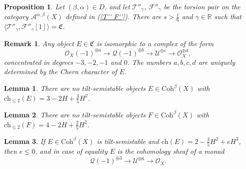 \documentclass[10pt,a4paper]{amsart}
\newtheorem{proposition}{Proposition}
\newtheorem{lemma}{Lemma}
\newtheorem{remark}{Remark}
\def\FF{\ensuremath{\mathcal F}}
\def\R{\ensuremath{\mathbb{R}}}
\def\TT{\ensuremath{\mathcal T}}
\begin{document}
	\begin{proposition}\label{heart}Let $(\beta,\alpha)\in D$, and let $ \TT''_{\gamma}$, $\FF''_{\gamma}$ be the torsion pair on the category $\mathcal A^{\alpha,\beta}(X)$ defined in (\ref{T'' F''}). There are $s>\frac 16$ and $\gamma\in\R$ such that
		$\langle \mathcal T''_{\gamma},\mathcal F''_{\gamma}[1]\rangle =\mathfrak C.$
	\end{proposition}

	\begin{remark}\label{complexes}
		Any object $E\in\mathfrak C$ is isomorphic to a complex of the form
		$$\mathcal O_{X}(-1)^{\oplus a}\to\mathcal Q(-1)^{\oplus b}\to\mathcal U^{\oplus c}\to\mathcal O_{X}^{\oplus d},$$
		concentrated in degrees $-3,-2,-1$ and $0$. The numbers $a,b,c,d$ are uniquely determined by the Chern character of $E$.
	\end{remark}

	\begin{lemma}\label{3 -2 3/5}There are no tilt-semistable objects $E\in\mathrm{Coh}^\beta(X)$ with $\mathrm{ch}_{\le 2}(E)=3-2H+\frac 35H^2$.
	\end{lemma}

	\begin{lemma}\label{4 -2 2/5} There are no tilt-semistable objects $F\in\mathrm{Coh}^\beta(X)$ with $\mathrm{ch}_{\le 2}(F)=4-2H+\frac 25H^2$.
	\end{lemma}

	\begin{lemma}\label{2 0 -3/5} If $E\in\mathrm{Coh}^\beta(X)$ is tilt-semistable and $\mathrm{ch}(E)=2-\frac 35H^2+eH^3$, then $e\le 0$, and in case of equality $E$ is the cohomology sheaf of a monad
		\begin{equation}\label{3-term}
			\mathcal Q(-1)^{\oplus 3}\to\mathcal U^{\oplus 6}\to\mathcal O_X.
		\end{equation}
	\end{lemma}
\end{document}
